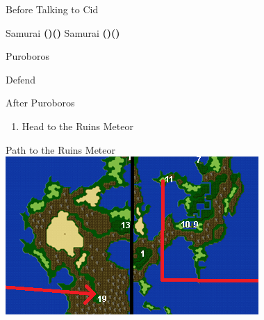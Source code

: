 \begin{paracol}{2}
\switchcolumn*
\begin{menu}{Before Talking to Cid}
    \varwb
    \begin{jobMenu}
        \faris Samurai \textbf{(\pointLeft)(\pointDown)}
        \bartz Samurai \textbf{(\pointLeft)(\pointDown)} \ability{!\hide}
    \end{jobMenu}
    \varwe
\end{menu}

\switchcolumnTwice[*]
\begin{boss}{Puroboros}
	\varwb
	\begin{round}{1}
		\lenna Defend
        \faris \leftCommand{\gilToss}
        \item {}
        \item {}
        \vspace{1mm}
        \item[] 
    \end{round}
	\varwe
\end{boss}

\switchcolumn
\begin{steproute}{After Puroboros}
\end{steproute}

\switchcolumn*
\begin{enumerate}[resume]
    \item Head to the Ruins Meteor
\end{enumerate}

\switchcolumn
\begin{misc}{Path to the Ruins Meteor}
    \includegraphics[scale=1.15]{../Graphics/Maps/9. To Ruins Meteor.png}
\end{misc}


\end{paracol}

